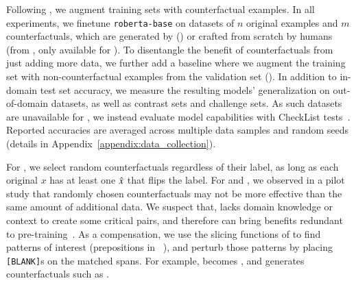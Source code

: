 \label{subsec:augmentation}
Following \citet{kaushik2019learning}, we augment training sets with counterfactual examples.
In all experiments, we finetune \texttt{roberta-base} on datasets of $n$ original examples and $m$ counterfactuals, which are generated by \sysname (\maug) or crafted from scratch by humans (\mcad from  \citet{kaushik2019learning}, only available for \nli). To disentangle the benefit of counterfactuals from just adding more data, we further add a baseline where we augment the training set with non-counterfactual examples from the validation set (\mcomp).
In addition to in-domain test set accuracy, we measure the resulting models' generalization on out-of-domain datasets, as well as contrast sets and challenge sets. As such datasets are unavailable for \qqp, we instead evaluate model capabilities with CheckList tests~\cite{checklist:acl20}.
Reported accuracies are averaged across multiple data samples and random seeds (details in Appendix~\ref{appendix:data_collection}).



For \sst, we select random \sysname counterfactuals regardless of their label, as long as each original $x$ has at least one $\hat{x}$ that flips the label.
For \nli and \qqp, we observed in a pilot study that randomly chosen counterfactuals may not be more effective than the same amount of additional data.
We suspect that, \sysname lacks domain knowledge or context to create some critical pairs, and therefore can bring benefits redundant to pre-training~\cite{longpre2020effective}.
As a compensation, we use the slicing functions of \citet{chen2019slice} to find patterns of interest (\eg prepositions in \nli~\cite{kim2019probing}), and perturb those patterns by placing \texttt{[BLANK]}s on the matched spans. For example,  becomes , and \sysname generates counterfactuals such as  .


